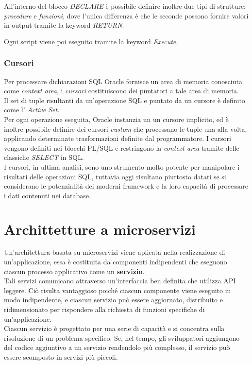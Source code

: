All'interno del blocco \textit{DECLARE} è possibile definire inoltre due tipi di strutture: \textit{procedure} e \textit{funzioni}, dove l'unica differenza è che le seconde possono fornire valori in output tramite la keyword \textit{RETURN}.

Ogni script viene poi eseguito tramite la keyword \textit{Execute}.

\subsubsection{Cursori}
Per processare dichiarazioni SQL Oracle fornisce un area di memoria conosciuta come \textit{context area}, i \textit{cursori} costituiscono dei puntatori a tale area di memoria.\\
Il set di tuple risultanti da un'operazione SQL e puntato da un cursore è definito come l' \textit{Active Set}.\\
Per ogni operazione eseguita, Oracle instanzia un un cursore implicito, ed è inoltre possibile definire dei cursori \textit{custom} che processano le tuple una alla volta, applicando determinate trasformazioni definite dal programmatore.
I cursori vengono definiti nei blocchi PL/SQL e restringono la \textit{context area} tramite delle classiche \textit{SELECT} in SQL.\\
I cursori, in ultima analisi, sono uno strumento molto potente per manipolare i risultati delle operazioni SQL, tuttavia oggi risultano piuttosto datati se si considerano le potenzialità dei moderni \gls{framework} e la loro capacità di processare i dati contenuti nei database.

\section{Archittetture a microservizi}\label{micro}
Un’architettura basata su microservizi viene aplicata nella realizzazione di un’applicazione, essa è costituita da componenti indipendenti che eseguono ciascun processo applicativo come un \textbf{servizio}.\\
Tali servizi comunicano attraverso un’interfaccia ben definita che utilizza API leggere. Ciò risulta vantaggioso poiché ciascun componente viene eseguito in modo indipendente, e ciascun servizio può essere aggiornato, distribuito e ridimensionato per rispondere alla richiesta di funzioni specifiche di un’applicazione.\\
Ciascun servizio è progettato per una serie di capacità e si concentra sulla risoluzione di un problema specifico. Se, nel tempo, gli sviluppatori aggiungono del codice aggiuntivo a un servizio rendendolo più complesso, il servizio può essere scomposto in servizi più piccoli.

